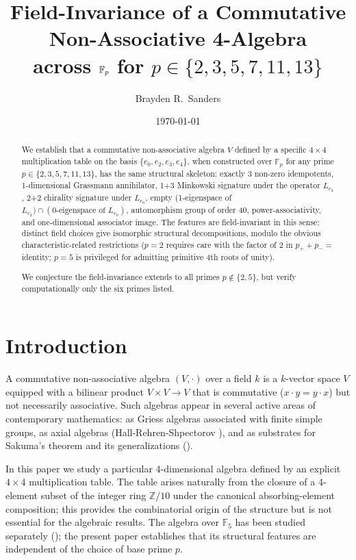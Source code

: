 \documentclass[11pt,reqno]{amsart}
\title[Field-Invariance of a 4-Algebra]
{Field-Invariance of a Commutative Non-Associative 4-Algebra \\
 across $\F_p$ for $p \in \{2,3,5,7,11,13\}$}
\author{Brayden R.~Sanders}
\date{\today}
\theoremstyle{plain}
\theoremstyle{definition}
\theoremstyle{remark}
\newcommand{\Z}{\mathbb{Z}}
\newcommand{\F}{\mathbb{F}}
\begin{document}
\begin{abstract}
We establish that a commutative non-associative algebra $V$ defined by a
specific $4 \times 4$ multiplication table on the basis
$\{e_0, e_2, e_3, e_4\}$, when constructed over $\F_p$ for any prime
$p \in \{2, 3, 5, 7, 11, 13\}$, has the same structural skeleton:
exactly 3 non-zero idempotents, 1-dimensional Grassmann annihilator,
1+3 Minkowski signature under the operator $L_{e_2}$, 2+2 chirality
signature under $L_{e_0}$, empty (1-eigenspace of $L_{e_2}) \cap
(\text{0-eigenspace of } L_{e_0})$, automorphism group of order 40,
power-associativity, and one-dimensional associator image. The features
are field-invariant in this sense: distinct field choices give
isomorphic structural decompositions, modulo the obvious
characteristic-related restrictions ($p=2$ requires care with the
factor of 2 in $p_+ + p_- = $ identity; $p=5$ is privileged for
admitting primitive 4th roots of unity).

We conjecture the field-invariance extends to all primes $p \notin
\{2,5\}$, but verify computationally only the six primes listed.
\end{abstract}

\maketitle

\tableofcontents

\section{Introduction}

A commutative non-associative algebra $(V, \cdot)$ over a field $k$ is
a $k$-vector space $V$ equipped with a bilinear product $V \times V \to V$
that is commutative ($x \cdot y = y \cdot x$) but not necessarily
associative.  Such algebras appear in several active areas of contemporary
mathematics: as Griess algebras associated with finite simple groups, as
axial algebras (Hall-Rehren-Shpectorov \cite{HallRehrenShpectorov2015}),
and as substrates for Sakuma's theorem and its generalizations
(\cite{Sakuma2007}).

In this paper we study a particular 4-dimensional algebra defined by an
explicit $4 \times 4$ multiplication table.  The table arises naturally
from the closure of a 4-element subset of the integer ring $\Z/10$ under
the canonical absorbing-element composition; this provides the
combinatorial origin of the structure but is not essential for the
algebraic results.  The algebra over $\F_5$ has been studied separately
(\cite{Sanders2026Dirac}); the present paper establishes that its
structural features are independent of the choice of base prime $p$.
\end{document}

